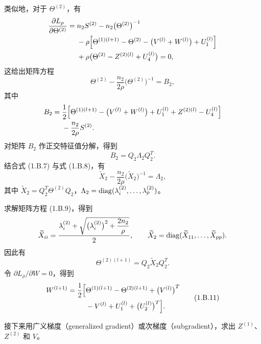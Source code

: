 类似地，对于 $\Theta^{(2)}$，有
\[
\begin{aligned}
\frac{\partial L_\rho}{\partial\Theta^{(2)}}
={}&n_2S^{(2)}-n_2\bigl(\Theta^{(2)}\bigr)^{-1} \\
&-\rho\Bigl[\Theta^{(1)(l+1)}-\Theta^{(2)}-\bigl(V^{(l)}+W^{(l)}\bigr)+U_1^{(l)}\Bigr] \\
&+\rho\bigl(\Theta^{(2)}-Z^{(2)(l)}+U_4^{(l)}\bigr)=0,
\end{aligned}
\]
这给出矩阵方程
\begin{equation}
\Theta^{(2)}-\frac{n_2}{2\rho}\bigl(\Theta^{(2)}\bigr)^{-1}=B_2,
\tag{1.B.7}
\end{equation}
其中
\[
\begin{aligned}
B_2={}&\frac12\Bigl[\Theta^{(1)(l+1)}-\bigl(V^{(l)}+W^{(l)}\bigr)+U_1^{(l)}
+Z^{(2)(l)}-U_4^{(l)}\Bigr] \\
&-\frac{n_2}{2\rho}S^{(2)}.
\end{aligned}
\]
对矩阵 $B_2$ 作正交特征值分解，得到
\begin{equation}
B_2=Q_2\Lambda_2Q_2^T.
\tag{1.B.8}
\end{equation}
结合式 (1.B.7) 与式 (1.B.8)，有
\begin{equation}
\widetilde X_2-\frac{n_2}{2\rho}\bigl(\widetilde X_2\bigr)^{-1}=\Lambda_2,
\tag{1.B.9}
\end{equation}
其中 $\widetilde X_2=Q_2^T\Theta^{(2)}Q_2$，$\Lambda_2=\operatorname{diag}(\lambda_i^{(2)},\ldots,\lambda_p^{(2)})$。

求解矩阵方程 (1.B.9)，得到
\[
\widetilde X_{ii}=\frac{\lambda_i^{(2)}+\sqrt{\bigl(\lambda_i^{(2)}\bigr)^2+\dfrac{2n_2}{\rho}}}{2},
\qquad \widetilde X_2=\operatorname{diag}(\widetilde X_{11},\ldots,\widetilde X_{pp}).
\]
因此有
\begin{equation}
\Theta^{(2)(l+1)}=Q_2\widetilde X_2Q_2^T.
\tag{1.B.10}
\end{equation}
令 $\partial L_\rho/\partial W=0$，得到
\begin{equation}
\begin{aligned}
W^{(l+1)}=\frac12\Bigl[{}&\Theta^{(1)(l+1)}-\Theta^{(2)(l+1)}+\bigl(V^{(l)}\bigr)^T \\
&-V^{(l)}+U_1^{(l)}+\bigl(U_2^{(l)}\bigr)^T\Bigr].
\end{aligned}
\tag{1.B.11}
\end{equation}

接下来用广义梯度（generalized gradient）或次梯度（subgradient），求出 $Z^{(1)}$、$Z^{(2)}$ 和 $V$。

